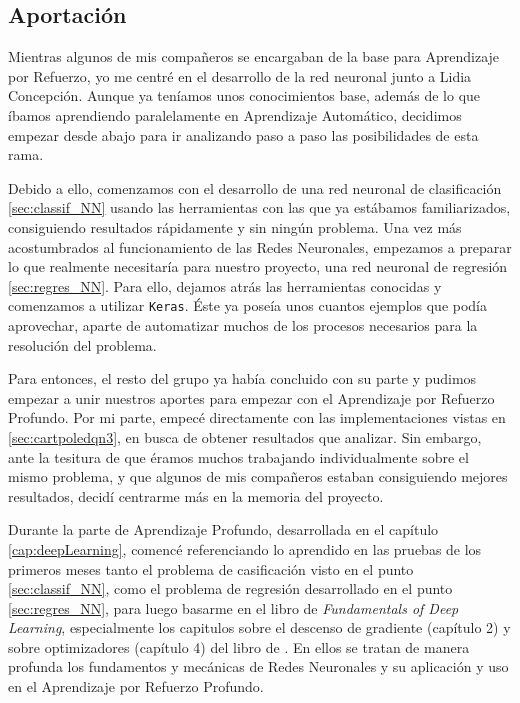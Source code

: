 \subsection{Aportación}

Mientras algunos de mis compañeros se encargaban de la base para Aprendizaje por Refuerzo, yo me centré en el desarrollo de la red neuronal junto a Lidia Concepción. Aunque ya teníamos unos conocimientos base, además de lo que íbamos aprendiendo paralelamente en Aprendizaje Automático, decidimos empezar desde abajo para ir analizando paso a paso las posibilidades de esta rama.

Debido a ello, comenzamos con el desarrollo de una red neuronal de clasificación \ref{sec:classif_NN} usando las herramientas con las que ya estábamos familiarizados, consiguiendo resultados rápidamente y sin ningún problema. Una vez más acostumbrados al funcionamiento de las Redes Neuronales, empezamos a preparar lo que realmente necesitaría para nuestro proyecto, una red neuronal de regresión \ref{sec:regres_NN}. Para ello, dejamos atrás las herramientas conocidas y comenzamos a utilizar \texttt{Keras}. Éste ya poseía unos cuantos ejemplos que podía aprovechar, aparte de automatizar muchos de los procesos necesarios para la resolución del problema.

Para entonces, el resto del grupo ya había concluido con su parte y pudimos empezar a unir nuestros aportes para empezar con el Aprendizaje por Refuerzo Profundo. Por mi parte, empecé directamente con las implementaciones vistas en \ref{sec:cartpoledqn3}, en busca de obtener resultados que analizar. Sin embargo, ante la tesitura de que éramos muchos trabajando individualmente sobre el mismo problema, y que algunos de mis compañeros estaban consiguiendo mejores resultados, decidí centrarme más en la memoria del proyecto.

Durante la parte de Aprendizaje Profundo, desarrollada en el capítulo \ref{cap:deepLearning}, comencé referenciando lo aprendido en las pruebas de los primeros meses tanto el problema de casificación visto en el punto \ref{sec:classif_NN}, como el problema de regresión  desarrollado en el punto \ref{sec:regres_NN}, para luego basarme en el libro de \textit{Fundamentals of Deep Learning}, especialmente los capitulos sobre el descenso de gradiente (capítulo 2) y sobre  optimizadores (capítulo 4) del libro de \citet{Buduma:general}. En ellos se tratan de manera profunda los fundamentos y mecánicas de Redes Neuronales y su aplicación y uso en el Aprendizaje por Refuerzo Profundo.

